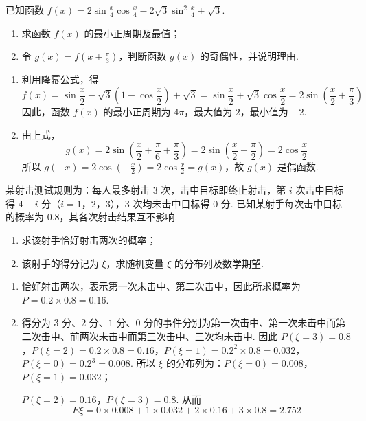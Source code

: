 \begin{problem}
已知函数 \( f(x) = 2\sin \frac{x}{4}\cos \frac{x}{4} - 2\sqrt{3}\sin^2 \frac{x}{4} + \sqrt{3} \).
\begin{enumerate}
\item 求函数 \( f(x) \) 的最小正周期及最值；
\item 令 \( g(x) = f\left(x + \frac{\pi}{3}\right) \)，判断函数 \( g(x) \) 的奇偶性，并说明理由.
\end{enumerate}
\end{problem}

\begin{solution}
\begin{enumerate}
\item 利用降幂公式，得
\[
f(x)=\sin\frac{x}{2}-\sqrt{3}\left(1-\cos\frac{x}{2}\right)+\sqrt{3}=\sin\frac{x}{2}+\sqrt{3}\cos\frac{x}{2}=2\sin\left(\frac{x}{2}+\frac{\pi}{3}\right)
\]
因此，函数 \(f(x)\) 的最小正周期为 \(4\pi\)，最大值为 \(2\)，最小值为 \(-2\).

\item 由上式，
\[
g(x)=2\sin\left(\frac{x}{2}+\frac{\pi}{6}+\frac{\pi}{3}\right)=2\sin\left(\frac{x}{2}+\frac{\pi}{2}\right)=2\cos\frac{x}{2}
\]
所以 \(g(-x)=2\cos\left(-\frac{x}{2}\right)=2\cos\frac{x}{2}=g(x)\)，故 \(g(x)\) 是偶函数.
\end{enumerate}
\end{solution}

\begin{problem}
某射击测试规则为：每人最多射击 \(3\) 次，击中目标即终止射击，第 \(i\) 次击中目标得 \(4-i\) 分（\(i = 1\)，\(2\)，\(3\)），\(3\) 次均未击中目标得 \(0\) 分. 已知某射手每次击中目标的概率为 \(0.8\)，其各次射击结果互不影响.
\begin{enumerate}
\item 求该射手恰好射击两次的概率；
\item 该射手的得分记为 \(\xi\)，求随机变量 \(\xi\) 的分布列及数学期望.
\end{enumerate}
\end{problem}

\begin{solution}
\begin{enumerate}
\item 恰好射击两次，表示第一次未击中、第二次击中，因此所求概率为 \(P=0.2\times0.8=0.16\).

\item 得分为 \(3\) 分、\(2\) 分、\(1\) 分、\(0\) 分的事件分别为第一次击中、第一次未击中而第二次击中、前两次未击中而第三次击中、三次均未击中. 因此 \(P(\xi=3)=0.8\)，\(P(\xi=2)=0.2\times0.8=0.16\)，\(P(\xi=1)=0.2^2\times0.8=0.032\)，\(P(\xi=0)=0.2^3=0.008\).
所以 \(\xi\) 的分布列为：\(P(\xi=0)=0.008\)，\(P(\xi=1)=0.032\)；

\(P(\xi=2)=0.16\)，\(P(\xi=3)=0.8\). 从而
\[
E\xi=0\times0.008+1\times0.032+2\times0.16+3\times0.8=2.752
\]
\end{enumerate}
\end{solution}

